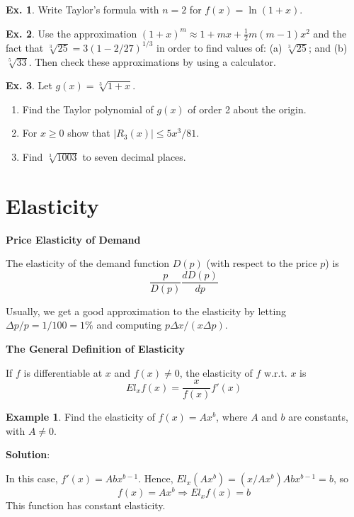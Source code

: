 \documentclass[10pt,a4paper]{book}
\theoremstyle{definition}\newtheorem{definition}{Definition}
\theoremstyle{definition}\newtheorem{fact}{Fact}
\theoremstyle{definition}\newtheorem{ex}{Ex.}
\theoremstyle{definition}\newtheorem{project}{Project}
\theoremstyle{definition}\newtheorem{problem}{Problem}
\theoremstyle{definition}\newtheorem{example}{Example}
\numberwithin{theorem}{chapter}
\numberwithin{corollary}{chapter}
\numberwithin{assumption}{chapter}
\numberwithin{definition}{chapter}
\numberwithin{prop}{chapter}
\numberwithin{notation}{chapter}
\numberwithin{problem}{chapter}
\numberwithin{example}{chapter}
\numberwithin{fact}{chapter}
\numberwithin{ex}{chapter}
\begin{document}
	\begin{ex}
		Write Taylor’s formula with $n = 2$ for $f (x) = \ln(1 + x)$.
	\end{ex}
	
	\begin{ex}
		Use the approximation $(1+x)^m \approx 1+mx+\frac{1}{2}m(m-1)x^2$ and the fact that $\sqrt[3]{25}=3(1-2/27)^{1/3}$ in order to find values of: (a) $\sqrt[3]{25}$; and (b) $\sqrt[5]{33}$. Then check these approximations by using a calculator.
	\end{ex}
	
	\begin{ex}
		Let $g(x)=\sqrt[3]{1+x}$.
		\begin{enumerate}[label=(\alph*)]
			\item Find the Taylor polynomial of $g(x)$ of order 2 about the origin.
			\item For $x \geq 0$ show that $|R_3(x)| \leq 5x^3/81$.
			\item Find $\sqrt[3]{1003}$ to seven decimal places.
		\end{enumerate}
	\end{ex}
	
	\section{Elasticity}
	
	\textbf{Price Elasticity of Demand}
	
	The elasticity of the demand function $D(p)$ (with respect to the price $p$) is
	$$\frac{p}{D(p)}\frac{d D(p)}{dp}$$
	
	Usually, we get a good approximation to the elasticity by letting $\Delta p/p = 1/100 = 1\%$ and computing $p\Delta x/(x\Delta p)$.
	
	\textbf{The General Definition of Elasticity}
	
	If $f$ is differentiable at $x$ and $f (x) \neq 0$, the elasticity of $f$ w.r.t. $x$ is
	$$El_x f(x) = \frac{x}{f(x)}f'(x)$$
	
	\begin{example}
		Find the elasticity of $f(x) = Ax^b$, where $A$ and $b$ are constants, with $A \neq 0$.
		
		\textbf{Solution}:
		
		In this case, $f'(x) = Abx^{b-1}$. Hence, $El_x(Ax^b) = (x/Ax^b)Abx^{b-1} = b$, so
		$$f(x) = Ax^b \Rightarrow El_x f(x) = b$$
		This function has constant elasticity. 
	\end{example}
	
\end{document}
